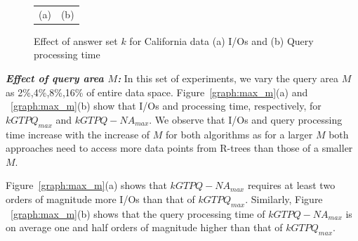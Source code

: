 \begin{figure}[htbp]
\begin{center}
\begin{tabular}{cc}
      \scriptsize{(a) \textsc{}\hspace{0mm}} & \scriptsize{(b) \textsc{}}\\
        \end{tabular}
    \caption{Effect of answer set $k$ for California data (a) I/Os and (b) Query processing time}
    \label{graph:max_k}
  \end{center}
   \vspace{-6mm}
\end{figure}
\vspace*{10pt}


\textbf{\emph{Effect of query area $M$: }}In this set of experiments, we vary the query area $M$ as 2\%,4\%,8\%,16\% of entire data space. Figure~\ref{graph:max_m}(a) and ~\ref{graph:max_m}(b) show that I/Os
and processing time, respectively, for $kGTPQ_{max}$ and $kGTPQ-NA_{max}$. We observe that I/Os
and query processing time increase with the increase of $M$ for both algorithms
as for a larger $M$ both approaches need to access more data points from R-trees than those of a smaller
$M$.

Figure~\ref{graph:max_m}(a) shows that $kGTPQ-NA_{max}$ requires at least two orders of
magnitude more I/Os than that of $kGTPQ_{max}$. Similarly, Figure ~\ref{graph:max_m}(b)
shows that the query processing time of $kGTPQ-NA_{max}$ is on average one and half orders of magnitude higher
than that of $kGTPQ_{max}$.


